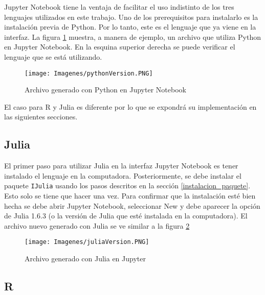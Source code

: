 \textsf{Jupyter Notebook} tiene la ventaja de facilitar el uso indistinto de los tres lenguajes utilizados en este trabajo. Uno de los prerequisitos para instalarlo es la instalación previa de \textsf{Python}. Por lo tanto, este es el lenguaje que ya viene en la interfaz. La figura \ref{pythonVersion} muestra, a manera de ejemplo, un archivo que utiliza \textsf{Python} en \textsf{Jupyter Notebook}. En la esquina superior derecha se puede verificar el lenguaje que se está utilizando. 

\begin{figure}[h]
	\begin{center}
		\texttt{[image: Imagenes/pythonVersion.PNG]}
		\caption{Archivo generado con Python en Jupyter Notebook}
		\label{pythonVersion}
	\end{center}
\end{figure}

El caso para \textsf{R} y \textsf{Julia} es diferente por lo que se expondrá su implementación en las siguientes secciones. 

\subsection{Julia}

El primer paso para utilizar \textsf{Julia} en la interfaz \textsf{Jupyter Notebook} es tener instalado el lenguaje en la computadora. Posteriormente, se debe instalar el paquete \texttt{IJulia} usando los pasos descritos en la sección \ref{instalacion_paquete}. Esto solo se tiene que hacer una vez. Para confirmar que la instalación esté bien hecha se debe abrir \textsf{Jupyter Notebook}, seleccionar \textsf{New} y debe aparecer la opción de \textsf{Julia 1.6.3} (o la versión de \textsf{Julia} que esté instalada en la computadora). El archivo nuevo generado con \textsf{Julia} se ve similar a la figura \ref{juliaVersion_ss}

\begin{figure}[h]
	\begin{center}
		\texttt{[image: Imagenes/juliaVersion.PNG]}
		\caption{Archivo generado con Julia en Jupyter}
		\label{juliaVersion_ss}
	\end{center}
\end{figure}

\subsection{R}

